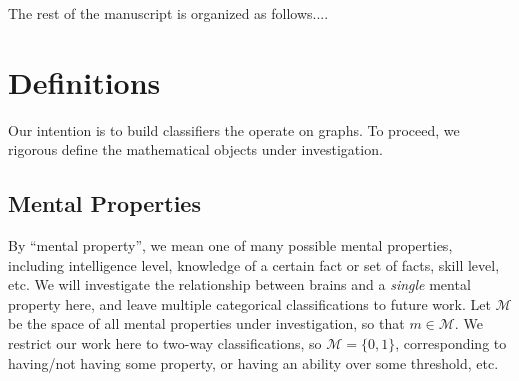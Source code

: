 \documentclass{article}
\newcommand{\mM}{\mathcal{M}}
\begin{document}
% 
% 
% 
% 


The rest of the manuscript is organized as follows....  %


\section{Definitions} %
\label{sec:def}

Our intention is to build classifiers the operate on graphs.  To proceed, we rigorous define the mathematical objects under investigation.

\subsection{Mental Properties} %
\label{sub:mental_properties}

By ``mental property'', we mean one of many possible mental properties, including intelligence level, knowledge of a certain fact or set of facts, skill level, etc.  We will investigate the relationship between brains and a \emph{single} mental property here, and leave multiple categorical classifications to future work.  Let $\mM$ be the space of all mental properties under investigation, so that $m \in \mM$.  We restrict our work here to two-way classifications, so $\mM=\{0,1\}$, corresponding to having/not having some property, or having an ability over some threshold, etc.  
\end{document}
